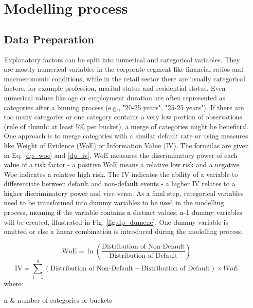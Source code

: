 \chapter{Modelling process}

\section{Data Preparation}
\label{sec:dataprep}
Explanatory factors can be split into numerical and categorical variables. They are mostly numerical variables in the corporate segment like financial ratios and macroeconomic conditions, while in the retail sector there are usually categorical factors, for example profession, marital status and residential status. Even numerical values like age or employment duration are often represented as categories after a binning process (e.g., "20-25 years", "25-25 years"). If there are too many categories or one category contains a very low portion of observations (rule of thumb: at least 5\% per bucket), a merge of categories might be beneficial. One approach is to merge categories with a similar default rate or using measures like Weight of Evidence (WoE) or Information Value (IV). The formulas are given in Eq. \ref{dp_woe} and \ref{dp_iv}. WoE measures the discriminatory power of each value of a risk factor - a positive WoE means a relative low risk and a negative Woe indicates a relative high risk. The IV indicates the ability of a variable to differentiate between default and non-default events - a higher IV relates to a higher discriminatory power and vice versa. As a final step, categorical variables need to be transformed into dummy variables to be used in the modelling process, meaning if the variable contains n distinct values, n-1 dummy variables will be created, illustrated in Fig. \ref{fig:dp_dumenc}. One dummy variable is omitted or else a linear combination is introduced during the modelling process.

\begin{equation}
\text{WoE} = \ln\left(\frac{\text{Distribution of Non-Default}}{\text{Distribution of Default}}\right) \label{dp_woe}
\end{equation}
\begin{equation}
\text{IV} = \sum_{i=1}^{n} (\text{Distribution of Non-Default} - \text{Distribution of Default}) \times WoE \label{dp_iv}
\end{equation}
where:
\begin{conditions}
n  	& number of categories or buckets 
\end{conditions}

